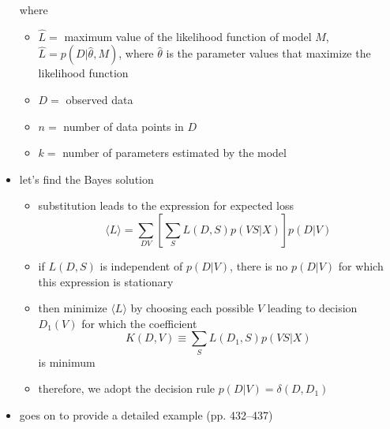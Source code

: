 \documentclass[../jaynes_prob_theory_notes.tex]{subfiles}
\begin{document}
\begin{itemize}
\begin{equation*}
                    \end{equation*}
                    where
                    \begin{itemize} 
                        \item \(\hat{L} =\) maximum value of the likelihood function of model \(M\), \( \hat{L} = p(D|\hat{\theta},M)\), where \(\hat{\theta}\) is the parameter values that maximize the likelihood function
                        \item \(D =\) observed data
                        \item \(n =\) number of data points in \(D\)
                        \item \(k =\) number of parameters estimated by the model
                    \end{itemize}
                \item let's find the Bayes solution 
                    \begin{itemize} 
                        \item substitution leads to the expression for expected loss
                            \begin{equation*} 
                                \langle L \rangle = \sum\limits_{DV} \left[ \sum\limits_S L(D,S)p(VS|X) \right] p(D|V)
                            \end{equation*}
                        \item if \(L(D,S)\) is independent of \(p(D|V)\), there is no \(p(D|V)\) for which this expression is stationary
                        \item then minimize \(\langle L \rangle\) by choosing each possible \(V\) leading to decision \(D_1 (V)\) for which the coefficient
                            \begin{equation*} 
                                K(D,V) \equiv \sum\limits_S L(D_1, S)p(VS|X)
                            \end{equation*}
                            is minimum
                        \item therefore, we adopt the decision rule \(p(D|V) = \delta (D, D_1)\)
                    \end{itemize}
                \item goes on to provide a detailed example (pp. 432--437)
            \end{itemize}
\end{document}

